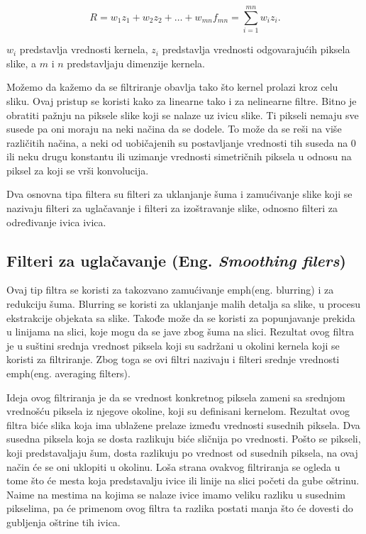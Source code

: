 \documentclass[a4paper,12pt,titlepage]{article}
\begin{document}
\begin{equation}\label{eq:conv5}
R = w_{1}z_{1} + w_{2}z_{2} + \dots + w_{mn}f_{mn} = \sum_{i = 1}^{mn} w_{i}z_{i}.
\end{equation}

$w_{i}$ predstavlja vrednosti kernela, $z_{i}$ predstavlja vrednosti odgovarajućih piksela slike, a $m$ i $n$ predstavljaju dimenzije kernela.

Možemo da kažemo da se filtriranje obavlja tako što kernel prolazi kroz celu sliku. Ovaj pristup se koristi kako za linearne tako i za nelinearne filtre. Bitno je obratiti pažnju na piksele slike koji se nalaze uz ivicu slike. Ti pikseli nemaju sve susede pa oni moraju na neki načina da se dodele. To može da se reši na više različitih načina, a neki od uobičajenih su postavljanje vrednosti tih suseda na 0 ili neku drugu konstantu ili uzimanje vrednosti simetričnih piksela u odnosu na piksel za koji se vrši konvolucija. 

Dva osnovna tipa filtera su filteri za uklanjanje šuma i zamućivanje slike koji se nazivaju filteri za uglačavanje i filteri za izoštravanje slike, odnosno filteri za određivanje ivica ivica.

\subsection{Filteri za uglačavanje (Eng. \emph{Smoothing filers})}%

Ovaj tip filtra se koristi za takozvano zamućivanje emph{(eng. blurring)} i za redukciju šuma. Blurring se koristi za uklanjanje malih detalja sa slike, u procesu ekstrakcije objekata sa slike. Takođe može da se koristi za popunjavanje prekida u linijama na slici, koje mogu da se jave zbog šuma na slici. Rezultat ovog filtra je u suštini srednja vrednost piksela koji su sadržani u okolini kernela koji se koristi za filtriranje. Zbog toga se ovi filtri nazivaju i filteri srednje vrednosti emph{(eng. averaging filters)}. 

Ideja ovog filtriranja je da se vrednost konkretnog piksela zameni sa srednjom vrednošću piksela iz njegove okoline, koji su definisani kernelom. Rezultat ovog filtra biće slika koja ima ublažene prelaze između vrednosti susednih piksela. Dva susedna piksela koja se dosta razlikuju biće sličnija po vrednosti. Pošto se pikseli, koji predstavaljaju šum, dosta razlikuju po vrednost od susednih piksela, na ovaj način će se oni uklopiti u okolinu. Loša strana ovakvog filtriranja se ogleda u tome što će mesta koja predstavalju ivice ili linije na slici početi da gube oštrinu. Naime na mestima na kojima se nalaze ivice imamo veliku razliku u susednim pikselima, pa će primenom ovog filtra ta razlika postati manja što će dovesti do gubljenja oštrine tih ivica.
\end{document}
